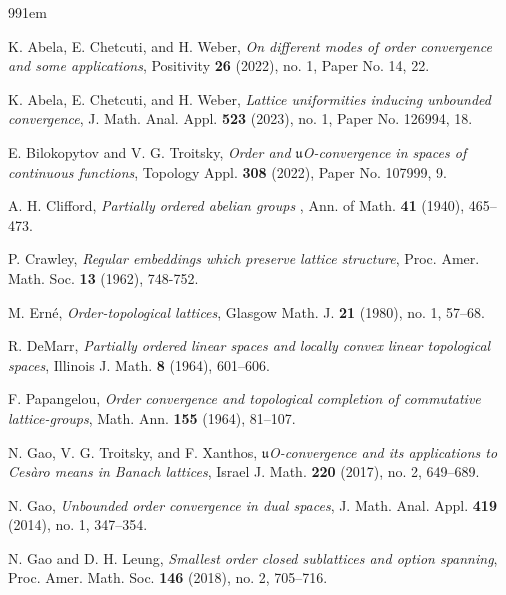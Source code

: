\documentclass[12pt,a4paper]{amsart}
\numberwithin{equation}{section}
\theoremstyle{definition}
\begin{document}
   \def\bibindent{1em}
\begin{thebibliography}{99\kern\bibindent}
	
    K.  Abela, E.  Chetcuti, and H. Weber, \textit{On different modes of order convergence and some applications}, Positivity \textbf{26} (2022), no. 1, Paper No. 14, 22.
	
	K. Abela, E. Chetcuti, and H. Weber, \textit{Lattice uniformities inducing unbounded convergence}, J. Math. Anal. Appl. \textbf{523} (2023), no. 1, Paper No. 126994, 18.
	
	E. Bilokopytov and V. G. Troitsky, \textit{Order and $\mathfrak{u}$O-convergence in spaces of continuous functions}, Topology Appl. \textbf{308} (2022), Paper No. 107999, 9.

A. H. Clifford, \textit{Partially ordered abelian groups} , Ann. of Math. \textbf{41} (1940), 465–473.

P. Crawley, \textit{Regular embeddings which preserve lattice structure}, Proc. Amer. Math. Soc. {\bf 13} (1962), 748-752.


M. Ern\'{e}, \textit{Order-topological lattices}, Glasgow Math. J. \textbf{21} (1980), no. 1, 57–68.

    
	R. DeMarr, \textit{Partially ordered linear spaces and locally convex linear topological spaces}, Illinois J. Math. \textbf{8} (1964), 601–606.
	
	F. Papangelou, \textit{Order convergence and topological completion of commutative lattice-groups}, Math. Ann. \textbf{155} (1964), 81–107.
	
 
	N. Gao, V. G. Troitsky, and F. Xanthos, \textit{$\mathfrak{u}$O-convergence and its applications to Ces\`aro means in Banach lattices}, Israel J. Math. \textbf{220} (2017), no. 2, 649–689.
	
	N. Gao, \textit{Unbounded order convergence in dual spaces}, J. Math. Anal. Appl. \textbf{419} (2014), no. 1, 347–354.
	
	N. Gao and D. H. Leung, \textit{Smallest order closed sublattices and option spanning}, Proc. Amer. Math. Soc. \textbf{146} (2018), no. 2, 705–716.
	

\end{thebibliography}
\end{document}
